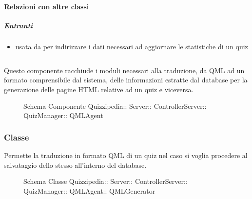 \paragraph{Relazioni con altre classi}
\subparagraph{Entranti}
\begin{itemize}
\item usata da  per indirizzare i dati necessari ad aggiornare le statistiche di un quiz
\end{itemize}
\subsection{}
Questo componente racchiude i moduli necessari alla traduzione, da QML ad un formato comprensibile dal sistema, delle informazioni estratte dal database per la generazione delle pagine HTML relative ad un quiz e viceversa.
\begin{figure}[H]
\centering
\noindent{}
\caption[Schema Componente QMLAgent]{Schema Componente Quizzipedia:: Server:: ControllerServer:: QuizManager:: QMLAgent}
\end{figure}
\subsubsection{Classe }
Permette la traduzione in formato QML di un quiz nel caso si voglia procedere al salvataggio dello stesso all'interno del database.
\begin{figure}[H]
\centering
\noindent{}
\caption[Schema Classe QMLGenerator]{Schema Classe Quizzipedia:: Server:: ControllerServer:: QuizManager:: QMLAgent:: QMLGenerator}
\end{figure}
